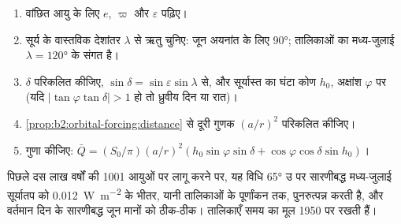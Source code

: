 \begin{method}[अतीत का सूर्यातप]\label{met:b2:orbital-forcing:curve}
\begin{enumerate}
  \item वांछित आयु के लिए $e$, $\varpi$ और $\varepsilon$ पढ़िए।
  \item सूर्य के वास्तविक देशांतर $\lambda$ से ऋतु चुनिए: जून अयनांत के लिए \ang{90};
        तालिकाओं का मध्य-जुलाई $\lambda = \ang{120}$ के संगत है।
  \item $\delta$ परिकलित कीजिए, $\sin\delta = \sin\varepsilon\sin\lambda$ से, और सूर्यास्त का घंटा कोण $h_0$,
        अक्षांश $\varphi$ पर (यदि $|\tan\varphi\tan\delta| > 1$ हो तो ध्रुवीय दिन या रात)।
  \item \cref{prop:b2:orbital-forcing:distance} से दूरी गुणक $(a/r)^2$ परिकलित कीजिए।
  \item गुणा कीजिए: $\bar Q = (S_0/\pi)(a/r)^2(h_0\sin\varphi\sin\delta +
        \cos\varphi\cos\delta\sin h_0)$।
\end{enumerate}
\end{method}

पिछले दस लाख वर्षों की 1001 आयुओं पर लागू करने पर, यह विधि \ang{65} उ पर सारणीबद्ध मध्य-जुलाई
सूर्यातप को \qty{0.012}{W.m^{-2}} के भीतर, यानी तालिकाओं के पूर्णांकन तक, पुनरुत्पन्न करती है, और
वर्तमान दिन के सारणीबद्ध जून मानों को ठीक-ठीक। तालिकाएँ समय का मूल 1950 पर रखती हैं।

